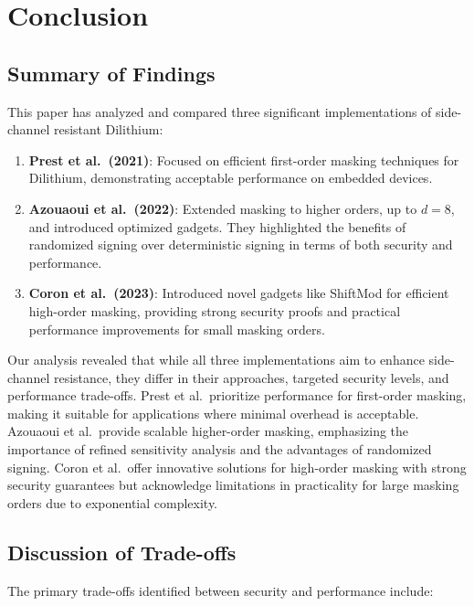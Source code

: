 
\chapter{Conclusion}
\thispagestyle{chapterstart}

\section{Summary of Findings}

This paper has analyzed and compared three significant implementations of side-channel resistant Dilithium:

\begin{enumerate}
    \item \textbf{Prest et al.\ (2021)}: Focused on efficient first-order masking techniques for Dilithium, demonstrating acceptable performance on embedded devices.
    \item \textbf{Azouaoui et al.\ (2022)}: Extended masking to higher orders, up to \( d = 8 \), and introduced optimized gadgets. They highlighted the benefits of randomized signing over deterministic signing in terms of both security and performance.
    \item \textbf{Coron et al.\ (2023)}: Introduced novel gadgets like ShiftMod for efficient high-order masking, providing strong security proofs and practical performance improvements for small masking orders.
\end{enumerate}

Our analysis revealed that while all three implementations aim to enhance side-channel resistance, they differ in their approaches, targeted security levels, and performance trade-offs. Prest et al.\ prioritize performance for first-order masking, making it suitable for applications where minimal overhead is acceptable. Azouaoui et al.\ provide scalable higher-order masking, emphasizing the importance of refined sensitivity analysis and the advantages of randomized signing. Coron et al.\ offer innovative solutions for high-order masking with strong security guarantees but acknowledge limitations in practicality for large masking orders due to exponential complexity.

\section{Discussion of Trade-offs}

The primary trade-offs identified between security and performance include:

